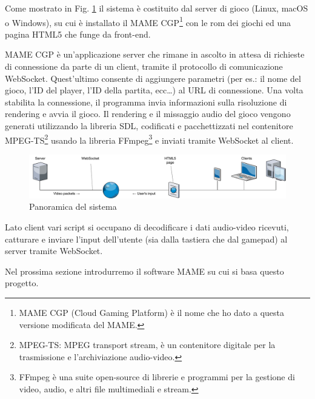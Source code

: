 Come mostrato in Fig. \ref{fig:proposed_system} il sistema è costituito dal server di gioco (Linux, macOS o Windows), su cui è installato il MAME CGP\footnote{MAME CGP (Cloud Gaming Platform) è il nome che ho dato a questa versione modificata del MAME.} con le rom dei giochi ed una pagina HTML5 che funge da front-end.

MAME CGP è un'applicazione server che rimane in ascolto in attesa di richieste di connessione da parte di un client, tramite il protocollo di comunicazione WebSocket. Quest'ultimo consente di aggiungere parametri (per es.: il nome del gioco, l'ID del player, l'ID della partita, ecc\dots) al URL di connessione. Una volta stabilita la connessione, il programma invia informazioni sulla risoluzione di rendering e avvia il gioco. Il rendering e il missaggio audio del gioco vengono generati utilizzando la libreria SDL, codificati e pacchettizzati nel contenitore MPEG-TS\footnote{MPEG-TS: MPEG transport stream, è un contenitore digitale per la trasmissione e l'archiviazione audio-video.} usando la libreria FFmpeg\footnote{FFmpeg è una suite open-source di librerie e programmi per la gestione di video, audio, e altri file multimediali e stream.} e inviati tramite WebSocket al client.

\begin{figure}[H]
	\includegraphics[width=\linewidth]{immagini/proposed_system}
	\caption{Panoramica del sistema}
	\label{fig:proposed_system}
\end{figure}

Lato client vari script si occupano di decodificare i dati audio-video ricevuti, catturare e inviare l'input dell'utente (sia dalla tastiera che dal gamepad) al server tramite WebSocket.

Nel prossima sezione introdurremo il software MAME su cui si basa questo progetto.




